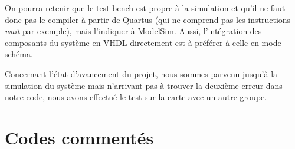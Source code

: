 \documentclass[a4paper]{report}
\begin{document}
On pourra retenir que le test-bench est propre à la simulation et qu'il ne faut donc pas le compiler à partir de Quartus (qui ne comprend pas les instructions \emph{wait} par exemple), mais l'indiquer à ModelSim.
Aussi, l'intégration des composants du système en VHDL directement est à préférer à celle en mode schéma.

Concernant l'état d'avancement du projet, nous sommes parvenu jusqu'à la simulation du système mais n'arrivant pas à trouver la deuxième erreur dans notre code, nous avons effectué le test sur la carte avec un autre groupe.

\part{Codes commentés}
\end{document}
